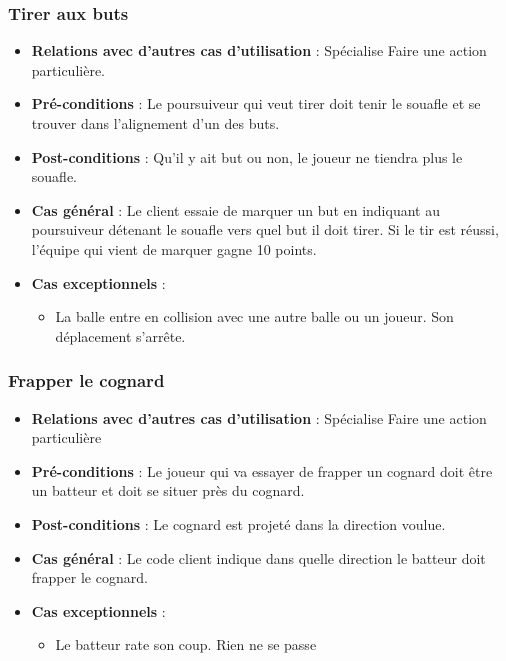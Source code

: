 \documentclass[a4paper,titlepage]{scrreprt}
\begin{document}
     \subsubsection{Tirer aux buts}
      \begin{itemize}
        \item \textbf{Relations avec d'autres cas d'utilisation}  : Spécialise Faire une action particulière.
        \item \textbf{Pré-conditions} : Le poursuiveur qui veut tirer doit tenir le souafle et se trouver dans l’alignement d’un des buts. 
        \item \textbf{Post-conditions} : Qu’il y ait but ou non, le joueur ne tiendra plus le souafle.
        \item \textbf{Cas général} : Le client essaie de marquer un but en indiquant au poursuiveur détenant le souafle vers quel but il doit tirer.  Si le tir est réussi, l'équipe qui vient de marquer gagne 10 points. %
         \item \textbf{Cas exceptionnels} :
           \begin{itemize}
            \item La balle entre en collision avec une autre balle ou un joueur. Son déplacement s'arrête.
           \end{itemize}
      \end{itemize}

    \subsubsection{Frapper le cognard}
      \begin{itemize}
        \item \textbf{Relations avec d'autres cas d'utilisation}  : Spécialise Faire une action particulière
        \item \textbf{Pré-conditions} : Le joueur qui va essayer de frapper un \gls{cognard} doit être un batteur et doit se situer près du cognard.
        \item \textbf{Post-conditions} : Le cognard est projeté dans la direction voulue.
        \item \textbf{Cas général} : Le code client indique dans quelle direction le batteur doit frapper le cognard.
        \item \textbf{Cas exceptionnels} :
          \begin{itemize}
        \item Le batteur rate son coup. Rien ne se passe%
          \end{itemize}
      \end{itemize}
\end{document}
